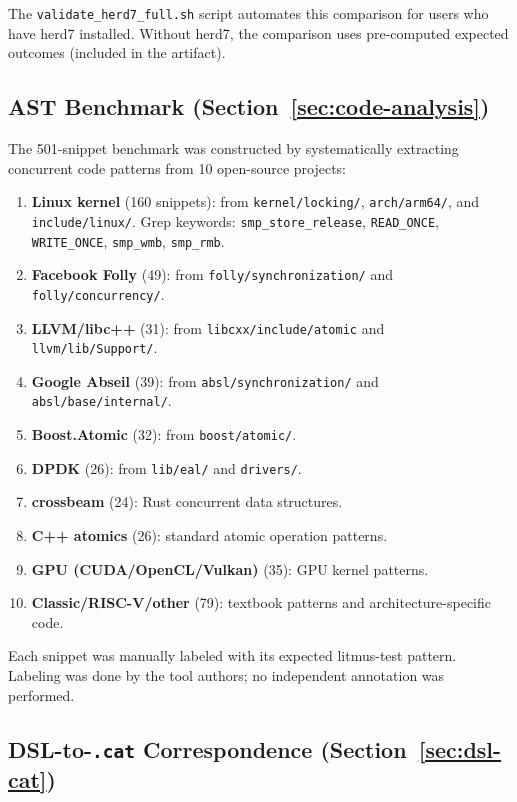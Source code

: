 \documentclass[11pt]{article}
\begin{document}
The \texttt{validate\_herd7\_full.sh} script automates this comparison
for users who have herd7 installed.  Without herd7, the comparison
uses pre-computed expected outcomes (included in the artifact).

\subsection{AST Benchmark (Section~\ref{sec:code-analysis})}

The 501-snippet benchmark was constructed by systematically extracting
concurrent code patterns from 10 open-source projects:

\begin{enumerate}[nosep]
\item \textbf{Linux kernel} (160 snippets): from
  \texttt{kernel/\allowbreak{}locking/},
  \texttt{arch/\allowbreak{}arm64/}, and
  \texttt{include/\allowbreak{}linux/}.
  Grep keywords: \texttt{smp\_store\_release},
  \texttt{READ\_ONCE}, \texttt{WRITE\_ONCE},
  \texttt{smp\_wmb}, \texttt{smp\_rmb}.
\item \textbf{Facebook Folly} (49): from \texttt{folly/synchronization/}
  and \texttt{folly/concurrency/}.
\item \textbf{LLVM/libc++} (31): from \texttt{libcxx/include/atomic}
  and \texttt{llvm/lib/Support/}.
\item \textbf{Google Abseil} (39): from \texttt{absl/synchronization/}
  and \texttt{absl/base/internal/}.
\item \textbf{Boost.Atomic} (32): from \texttt{boost/atomic/}.
\item \textbf{DPDK} (26): from \texttt{lib/eal/} and \texttt{drivers/}.
\item \textbf{crossbeam} (24): Rust concurrent data structures.
\item \textbf{C++ atomics} (26): standard atomic operation patterns.
\item \textbf{GPU (CUDA/OpenCL/Vulkan)} (35): GPU kernel patterns.
\item \textbf{Classic/RISC-V/other} (79): textbook patterns and
  architecture-specific code.
\end{enumerate}

\noindent
Each snippet was manually labeled with its expected litmus-test pattern.
Labeling was done by the tool authors; no independent annotation was performed.

\subsection{DSL-to-\texttt{.cat} Correspondence (Section~\ref{sec:dsl-cat})}
\end{document}
